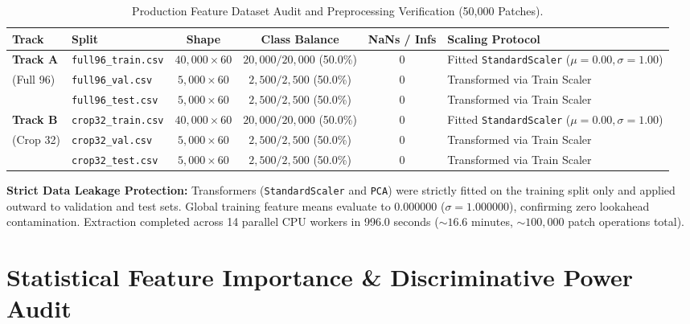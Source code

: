 \documentclass[11pt,a4paper]{article}
\begin{document}
\begin{table}[H]
\centering
\small
\caption{Production Feature Dataset Audit and Preprocessing Verification (50,000 Patches).}
\label{tab:feature_datasets}
\begin{tabular}{@{}llcccl@{}}
\toprule
\textbf{Track} & \textbf{Split} & \textbf{Shape} & \textbf{Class Balance} & \textbf{NaNs / Infs} & \textbf{Scaling Protocol} \\
\midrule
\textbf{Track A} & \texttt{full96\_train.csv} & $40,000 \times 60$ & $20,000 / 20,000$ (50.0\%) & 0 & Fitted \texttt{StandardScaler} ($\mu=0.00, \sigma=1.00$) \\
(Full 96) & \texttt{full96\_val.csv}   & $5,000 \times 60$  & $2,500 / 2,500$ (50.0\%) & 0 & Transformed via Train Scaler \\
          & \texttt{full96\_test.csv}  & $5,000 \times 60$  & $2,500 / 2,500$ (50.0\%) & 0 & Transformed via Train Scaler \\
\midrule
\textbf{Track B} & \texttt{crop32\_train.csv} & $40,000 \times 60$ & $20,000 / 20,000$ (50.0\%) & 0 & Fitted \texttt{StandardScaler} ($\mu=0.00, \sigma=1.00$) \\
(Crop 32) & \texttt{crop32\_val.csv}   & $5,000 \times 60$  & $2,500 / 2,500$ (50.0\%) & 0 & Transformed via Train Scaler \\
          & \texttt{crop32\_test.csv}  & $5,000 \times 60$  & $2,500 / 2,500$ (50.0\%) & 0 & Transformed via Train Scaler \\
\bottomrule
\end{tabular}
\end{table}

\noindent\textbf{Strict Data Leakage Protection:}
Transformers (\texttt{StandardScaler} and \texttt{PCA}) were strictly fitted on the training split only and applied outward to validation and test sets. Global training feature means evaluate to $0.000000$ ($\sigma = 1.000000$), confirming zero lookahead contamination. Extraction completed across 14 parallel CPU workers in 996.0 seconds ($\sim 16.6$ minutes, $\sim 100,000$ patch operations total).

\section{Statistical Feature Importance \& Discriminative Power Audit}
\end{document}
